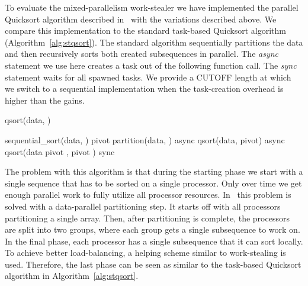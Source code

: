 \documentclass[preprint]{sigplanconf}
\begin{document}
To evaluate the mixed-parallelism work-stealer we have implemented the
parallel Quicksort algorithm described in~\cite{TsigasZhang03} with
the variations described above. We compare this implementation to the standard
task-based Quicksort algorithm (Algorithm~\ref{alg:stqsort}). The
standard algorithm sequentially partitions the data and then
recursively sorts both created subsequences in parallel. The
\emph{async} statement we use here creates a task out of the following
function call. The \emph{sync} statement waits for all spawned
tasks. We provide a CUTOFF length at which we switch to a sequential
implementation when the task-creation overhead is higher than the
gains.

\begin{algorithm}
\caption{qsort(data, )}\label{alg:stqsort}
\begin{algorithmic}[1]
	\RETURN sequential\_sort(data, )
\ELSE
	\STATE pivot  partition(data, )
	\STATE async qsort(data, pivot)
	\STATE async qsort(data  pivot , pivot )
	\STATE sync
\ENDIF
\end{algorithmic}
\end{algorithm}

The problem with this algorithm is that during the starting phase we
start with a single sequence that has to be sorted on a single
processor. Only over time we get enough parallel work to fully utilize
all processor resources. In~\cite{TsigasZhang03} this problem is
solved with a data-parallel partitioning step. It starts off with all
processors partitioning a single array. Then, after partitioning is
complete, the processors are split into two groups, where each group
gets a single subsequence to work on. In the final phase, each
processor has a single subsequence that it can sort locally. To
achieve better load-balancing, a helping scheme similar to
work-stealing is used. Therefore, the last phase can be seen as
similar to the task-based Quicksort algorithm in
Algorithm~\ref{alg:stqsort}.
\end{document}
